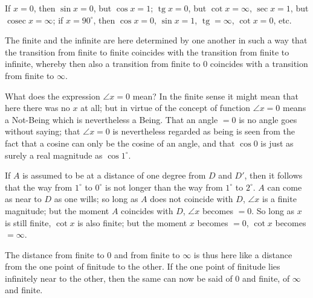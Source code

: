 \documentclass[12pt]{book}
\begin{document}
If $x = 0$, then $\sin x = 0$, but $\cos x = 1$; $\operatorname{tg} x = 0$, but
$\cot x = \infty$, $\sec x = 1$, but $\operatorname{cosec} x = \infty$; if
$x = 90^{\circ}$, then $\cos x = 0$, $\sin x = 1$, $\operatorname{tg} = \infty$,
$\cot x = 0$, etc.

The finite and the infinite are here determined by one another in such a way that
the transition from finite to finite coincides with the transition from finite to
infinite, whereby then also a transition from finite to $0$ coincides with a
transition from finite to $\infty$.

What does the expression $\angle x = 0$ mean? In the finite sense it might mean
that here there was no $x$ at all; but in virtue of the concept of function
$\angle x = 0$ means a Not-Being which is nevertheless a Being. That an angle
$= 0$ is no angle goes without saying; that $\angle x = 0$ is nevertheless regarded
as being is seen from the fact that a cosine can only be the cosine of an angle,
and that $\cos 0$ is just as surely a real magnitude as $\cos 1^{\circ}$.
\begin{center}
\end{center}

If $A$ is assumed to be at a distance of one degree from $D$ and $D'$, then it
follows that the way from $1^{\circ}$ to $0^{\circ}$ is not longer than the way
from $1^{\circ}$ to $2^{\circ}$. $A$ can come as near to $D$ as one wills; so long
as $A$ does not coincide with $D$, $\angle x$ is a finite magnitude; but the moment
$A$ coincides with $D$, $\angle x$ becomes $= 0$. So long as $x$ is still finite,
$\cot x$ is also finite; but the moment $x$ becomes $= 0$, $\cot x$ becomes
$= \infty$.

The distance from finite to $0$ and from finite to $\infty$ is thus here like a
distance from the one point of finitude to the other. If the one point of finitude
lies infinitely near to the other, then the same can now be said of $0$ and finite,
of $\infty$ and finite.
\end{document}
